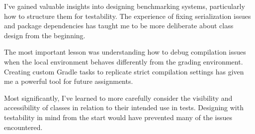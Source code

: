 \documentclass[11pt]{article}
\begin{document}
\begin{enumerate}
    I've gained valuable insights into designing benchmarking systems, particularly how to structure them for testability. The experience of fixing serialization issues and package dependencies has taught me to be more deliberate about class design from the beginning.
    
    The most important lesson was understanding how to debug compilation issues when the local environment behaves differently from the grading environment. Creating custom Gradle tasks to replicate strict compilation settings has given me a powerful tool for future assignments.
    
    Most significantly, I've learned to more carefully consider the visibility and accessibility of classes in relation to their intended use in tests. Designing with testability in mind from the start would have prevented many of the issues encountered.
\end{enumerate}
\end{document}
